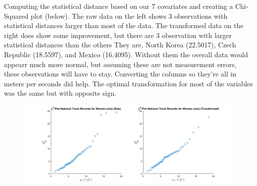 Computing the statistical distance based on our 7 covariates and creating a Chi-Squared plot (below). The raw data on the left shows 3 observations with statistical distances larger than most of the data. The transformed data on the right does show some improvement, but there are 3 observation with larger statistical distances than the others They are, North Korea (22.5017), Czech Republic (18.5597), and Mexico (16.4095). Without them the overall data would appearr much more normal, but assuming these are not measurement errors, these observations will have to stay. Converting the columns so they're all in meters per seconds did help. The optimal transformation for most of the variables was the same but with opposite sign.

\begin{center}
    \begin{figure}[H]
        \centering
        \includegraphics[scale=0.4]{./matlab/chapter-4/sol4.37.chi2.png}
    \end{figure}
\end{center}

